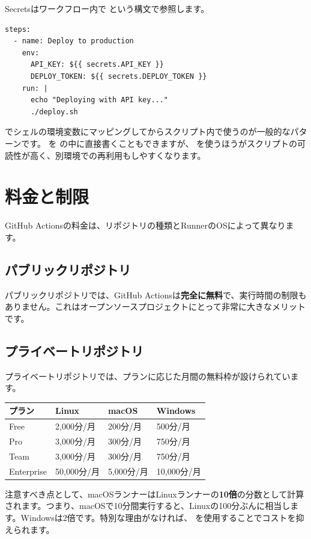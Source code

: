 Secretsはワークフロー内で  という構文で参照します。

\begin{lstlisting}[language={}]
steps:
  - name: Deploy to production
    env:
      API_KEY: ${{ secrets.API_KEY }}
      DEPLOY_TOKEN: ${{ secrets.DEPLOY_TOKEN }}
    run: |
      echo "Deploying with API key..."
      ./deploy.sh
\end{lstlisting}

 でシェルの環境変数にマッピングしてからスクリプト内で使うのが一般的なパターンです。 を  の中に直接書くこともできますが、 を使うほうがスクリプトの可読性が高く、別環境での再利用もしやすくなります。

\section{料金と制限}

GitHub Actionsの料金は、リポジトリの種類とRunnerのOSによって異なります。

\subsection{パブリックリポジトリ}

パブリックリポジトリでは、GitHub Actionsは\textbf{完全に無料}で、実行時間の制限もありません。これはオープンソースプロジェクトにとって非常に大きなメリットです。

\subsection{プライベートリポジトリ}

プライベートリポジトリでは、プランに応じた月間の無料枠が設けられています。

\begin{tabular}{|l|l|l|l|}
\hline
\textbf{プラン} & \textbf{Linux} & \textbf{macOS} & \textbf{Windows} \\
\hline
Free & 2,000分/月 & 200分/月 & 500分/月 \\
\hline
Pro & 3,000分/月 & 300分/月 & 750分/月 \\
\hline
Team & 3,000分/月 & 300分/月 & 750分/月 \\
\hline
Enterprise & 50,000分/月 & 5,000分/月 & 10,000分/月 \\
\hline
\end{tabular}

注意すべき点として、macOSランナーはLinuxランナーの\textbf{10倍}の分数として計算されます。つまり、macOSで10分間実行すると、Linuxの100分ぶんに相当します。Windowsは2倍です。特別な理由がなければ、 を使用することでコストを抑えられます。

